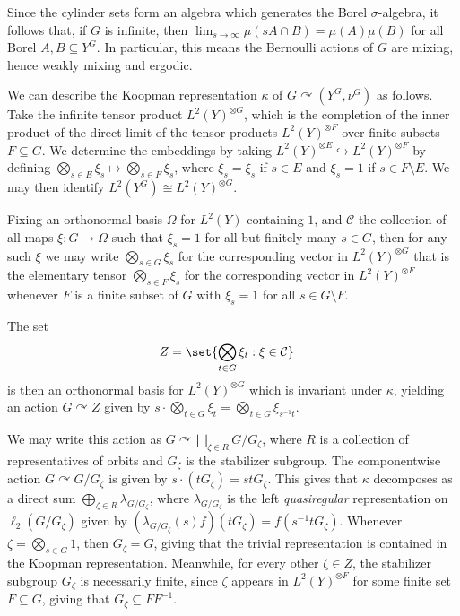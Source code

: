 \documentclass[10pt]{mypackage}
\begin{document}
Since the cylinder sets form an algebra which generates the Borel $\sigma$-algebra, it follows that, if  $G$ is infinite, then $\lim_{s\rightarrow\infty}\mu\left( sA\cap B \right) = \mu\left( A \right)\mu\left( B \right)$ for all Borel $A,B\subseteq Y^{G}$. In particular, this means the Bernoulli actions of $G$ are mixing, hence weakly mixing and ergodic.

We can describe the Koopman representation $\kappa$ of $G\curvearrowright \left( Y^G,\nu^G \right)$ as follows. Take the infinite tensor product $L^2\left( Y \right)^{\otimes G}$, which is the completion of the inner product of the direct limit of the tensor products $L^2\left( Y \right)^{\otimes F}$ over finite subsets $F\subseteq G$. We determine the embeddings by taking $L^2\left( Y \right)^{\otimes E}\hookrightarrow L^2\left( Y \right)^{\otimes F}$ by defining $\bigotimes_{s\in E}\xi_s\mapsto \bigotimes_{s\in F} \widetilde{\xi}_s$, where $ \widetilde{\xi}_s = \xi_s $ if $s\in E$ and $ \widetilde{\xi}_s = 1 $ if $s\in F\setminus E$. We may then identify $L^2\left( Y^{G} \right)\cong L^2\left( Y \right)^{\otimes G}$.

Fixing an orthonormal basis $\Omega$ for $L^2\left( Y \right)$ containing $1$, and $\mathcal{C}$ the collection of all maps $\xi\colon G\rightarrow \Omega$ such that $\xi_s = 1$ for all but finitely many $s\in G$, then for any such $\xi$ we may write $\bigotimes_{s\in G}\xi_s$ for the corresponding vector in $L^2\left( Y \right)^{\otimes G}$ that is the elementary tensor $\bigotimes_{s\in F}\xi_s$ for the corresponding vector in $L^2\left( Y \right)^{\otimes F}$ whenever $F$ is a finite subset of $G$ with $\xi_s = 1$ for all $s\in G\setminus F$.

The set
\begin{align*}
  Z &= \set{\bigotimes_{t\in G}\xi_t : \xi\in \mathcal{C}}
\end{align*}
is then an orthonormal basis for $L^2\left( Y \right)^{\otimes G}$ which is invariant under $\kappa$, yielding an action $G\curvearrowright Z$ given by $s\cdot \bigotimes_{t\in G}\xi_t = \bigotimes_{t\in G}\xi_{s^{-1}t}$.

We may write this action as $G\curvearrowright \bigsqcup_{\zeta\in R}G/G_{\zeta}$, where $R$ is a collection of representatives of orbits and $G_{\zeta}$ is the stabilizer subgroup. The componentwise action $G\curvearrowright G/G_{\zeta}$ is given by $s\cdot \left( tG_{\zeta} \right) = stG_{\zeta}$. This gives that $\kappa$ decomposes as a direct sum $\bigoplus_{\zeta\in R}\lambda_{G/G_{\zeta}}$, where $\lambda_{G/G_{\zeta}}$ is the left \textit{quasiregular} representation on $\ell_2\left( G/G_{\zeta} \right)$ given by $\left( \lambda_{G/G_{\zeta}}(s)f \right)\left( tG_{\zeta} \right) = f\left( s^{-1}tG_{\zeta} \right)$. Whenever $\zeta = \bigotimes_{s\in G}1$, then $G_{\zeta} = G$, giving that the trivial representation is contained in the Koopman representation. Meanwhile, for every other $\zeta\in Z$, the stabilizer subgroup $G_{\zeta}$ is necessarily finite, since $\zeta$ appears in $L^2\left( Y \right)^{\otimes F}$ for some finite set $F\subseteq G$, giving that $G_{\zeta}\subseteq FF^{-1}$.
\end{document}

